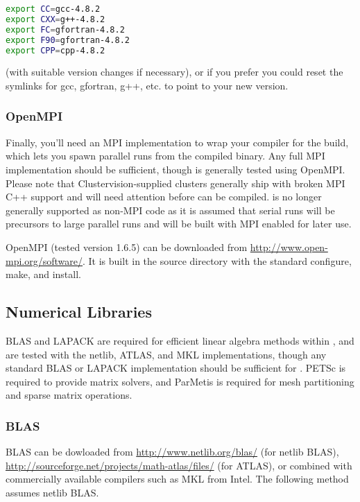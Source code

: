 \begin{lstlisting}[language=bash]
export CC=gcc-4.8.2
export CXX=g++-4.8.2
export FC=gfortran-4.8.2
export F90=gfortran-4.8.2
export CPP=cpp-4.8.2
\end{lstlisting}

(with suitable version changes if necessary), or if you prefer you could reset
the symlinks for gcc, gfortran, g++, etc. to point to your new version.

\subsubsection{OpenMPI}
\label{sec:required_libraries_compilers_openmpi}

Finally, you'll need an MPI implementation to wrap your compiler for the
\fluidity build, which lets you spawn parallel runs from the compiled \fluidity
binary. Any full MPI implementation should be sufficient, though \fluidity is
generally tested using OpenMPI. Please note that Clustervision-supplied
clusters generally ship with broken MPI C++ support and will need attention
before \fluidity can be compiled. \fluidity is no longer generally supported as
non-MPI code as it is assumed that serial runs will be precursors to large
parallel runs and will be built with MPI enabled for later use.

OpenMPI (tested version 1.6.5) can be downloaded from
\url{http://www.open-mpi.org/software/}. It is built in the source directory
with the standard configure, make, and install.

\subsection{Numerical Libraries}
\label{sec:required_libraries_numerical}

BLAS and LAPACK are required for efficient linear algebra methods within
\fluidity, and are tested with the netlib, ATLAS, and MKL implementations, though
any standard BLAS or LAPACK implementation should be sufficient for \fluidity.
PETSc is required to provide matrix solvers, and ParMetis is required for mesh
partitioning and sparse matrix operations.

\subsubsection{BLAS}
\label{sec:required_libraries_numerical_blas}

BLAS can be dowloaded from \url{http://www.netlib.org/blas/} (for netlib BLAS),
\url{http://sourceforge.net/projects/math-atlas/files/} (for ATLAS), or
combined with commercially available compilers such as MKL from Intel. The
following method assumes netlib BLAS.

